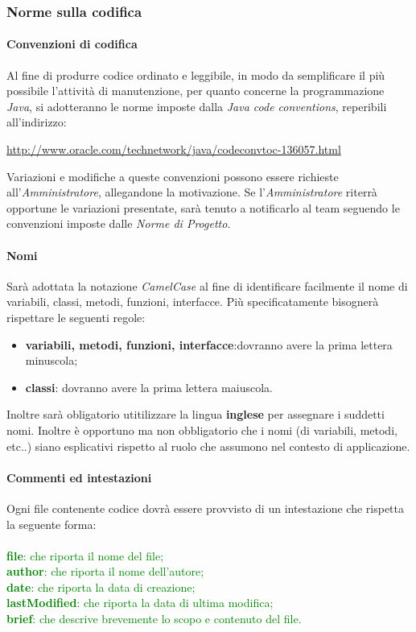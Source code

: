 \subsubsection{Norme sulla codifica}
\paragraph{Convenzioni di codifica}
Al fine di produrre codice ordinato e leggibile, in modo da semplificare il più possibile l'attività di manutenzione, per quanto concerne la programmazione \textit{Java}, si adotteranno le norme imposte dalla \textit{Java code conventions}, reperibili all'indirizzo:
\begin{center}
\href{http://www.oracle.com/technetwork/java/codeconvtoc-136057.html}{http://www.oracle.com/technetwork/java/codeconvtoc-136057.html}
\end{center}
Variazioni e modifiche a queste convenzioni possono essere richieste all'\textit{Amministratore}, allegandone la motivazione.
Se l'\textit{Amministratore} riterrà opportune le variazioni presentate, sarà tenuto a notificarlo al team seguendo le convenzioni imposte dalle \textit{Norme di Progetto}.

\paragraph{Nomi}
Sarà adottata la notazione \textit{CamelCase} al fine di identificare facilmente il nome di variabili, classi, metodi, funzioni, interfacce. Più specificatamente bisognerà rispettare le seguenti regole:
\begin{itemize}
\item \textbf{variabili, metodi, funzioni, interfacce}:dovranno avere la prima lettera minuscola;
\item \textbf{classi}: dovranno avere la prima lettera maiuscola.
\end{itemize}
Inoltre sarà obligatorio utitilizzare la lingua \textbf{inglese} per assegnare i suddetti nomi. 
Inoltre è opportuno ma non obbligatorio che i nomi (di variabili, metodi, etc..) siano esplicativi rispetto al ruolo che assumono nel contesto di applicazione.

\paragraph{Commenti ed intestazioni}

Ogni file contenente codice dovrà essere provvisto di un intestazione che rispetta la seguente forma:
\\
\\
\textcolor{green}{
\textbf{file}: che riporta il nome del file; \\
\textbf{author}: che riporta il nome dell'autore;\\
\textbf{date}: che riporta la data di creazione; \\
\textbf{lastModified}: che riporta la data di ultima modifica;\\
\textbf{brief}: che descrive brevemente lo scopo e contenuto del file.\\
}

